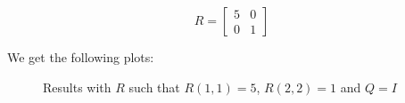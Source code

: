 \documentclass[10pt,a4paper]{article}
\begin{document}
\[
R = \begin{bmatrix}
5 & 0 \\
0 & 1
\end{bmatrix} 
\]

We get the following plots:

	\begin{figure}[H]
			\centering
            \caption{Results with $R$ such that $R(1,1) = 5$, $R(2,2) = 1$ and $Q = I$}
            \label{fig:Q1-xu1}
	\end{figure}
\end{document}
